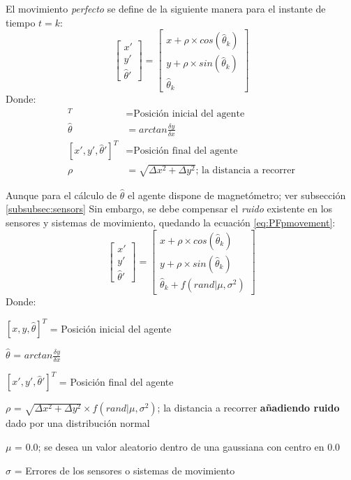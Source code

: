 El movimiento \emph{perfecto} se define de la siguiente manera para el instante de tiempo $t=k$:
\begin{equation}
\label{eq:PFpmovement}
\begin{bmatrix}
x'\\ 
y'\\ 
\hat{\theta}'
\end{bmatrix} = 
\begin{bmatrix}
x + \rho \times cos(\hat{\theta}_k)\\
y + \rho \times sin(\hat{\theta}_k)\\
\hat{\theta}_k
\end{bmatrix}
\end{equation}
Donde:
\begin{align*}
[x,y,\hat{\theta}]^T &= \text{Posición inicial del agente}\\
\hat{ \theta } &= arctan \frac{\delta y}{\delta x}\\
[x',y',\hat{\theta}']^T &= \text{Posición final del agente}\\
\rho &= \sqrt{\Delta x^2 + \Delta y^2}\text{; la distancia a recorrer}
\end{align*}

Aunque para el cálculo de $\hat{\theta}$ el agente dispone de magnetómetro; ver subsección \ref{subsubsec:sensors}
Sin embargo, se debe compensar el \emph{ruido} existente en los sensores y sistemas de movimiento, quedando la ecuación \ref{eq:PFpmovement}:
\begin{equation}
\label{eq:PFnmovement}
\begin{bmatrix}
x'\\ 
y'\\ 
\hat{\theta}'
\end{bmatrix} = 
\begin{bmatrix}
x + \rho \times cos(\hat{\theta}_k)\\
y + \rho \times sin(\hat{\theta}_k)\\
\hat{\theta}_k + f(rand | \mu, \sigma^2)
\end{bmatrix}
\end{equation}
Donde:

\begin{minipage}{\columnwidth}
\begin{center}
\begin{description}
\item $[x,y,\hat{\theta}]^T$ = Posición inicial del agente
\item $\hat{ \theta }$ = $arctan\frac{\delta y}{\delta x}$
\item $[x',y',\hat{\theta}']^T$ = Posición final del agente
\item $\rho$ = $\sqrt{\Delta x^2 + \Delta y^2} \times f(rand | \mu, \sigma^2)$; la distancia a recorrer \textbf{añadiendo ruido} dado por una distribución normal
\item $\mu$ = $0.0$; se desea un valor aleatorio dentro de una gaussiana con centro en 0.0
\item $\sigma$ = Errores de los sensores o sistemas de movimiento
\end{description}
\end{center}
\end{minipage}


